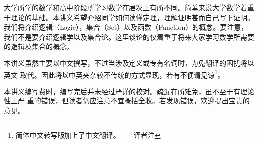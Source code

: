 

\begin{preface}

大学所学的数学和高中阶段所学习数学在层次上有所不同。简单来说大学数学着重于理论的基础。本讲义希望介绍同学如何读懂定理，理解证明甚而自己写下证明。我们将介绍逻辑（Logic），集合（Set）以及函数（Function）的概念。要注意，我们不是要介绍逻辑学以及集合论。这里谈论的仅着重于将来大家学习数学所需要的逻辑及集合的概念。

本讲义虽然主要以中文撰写，不过当涉及定义或专有名词时，为免翻译的困扰将以英文
取代。因此将以中英夹杂较不传统的方式显现，若有不便请见谅\footnote{简体中文转写版加上了中文翻译。——译者注}。

本讲义编写费时，编写完后并未经过严谨的校对。疏漏在所难免，虽不至于有理论性上严
重的错误，但读者仍应注意不宜概括全收。若发现错误，欢迎提出宝贵的意见。

\end{preface}

